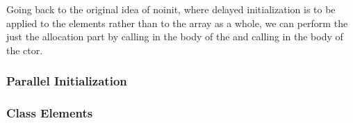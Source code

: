 Going back to the original idea of noinit, where delayed initialization is to be applied
to the elements rather than to the array as a whole, we can perform the just the
allocation part by calling  in the body of the  and
calling  in the body of the ctor.

\subsubsection{Parallel Initialization}


\subsubsection{Class Elements}

